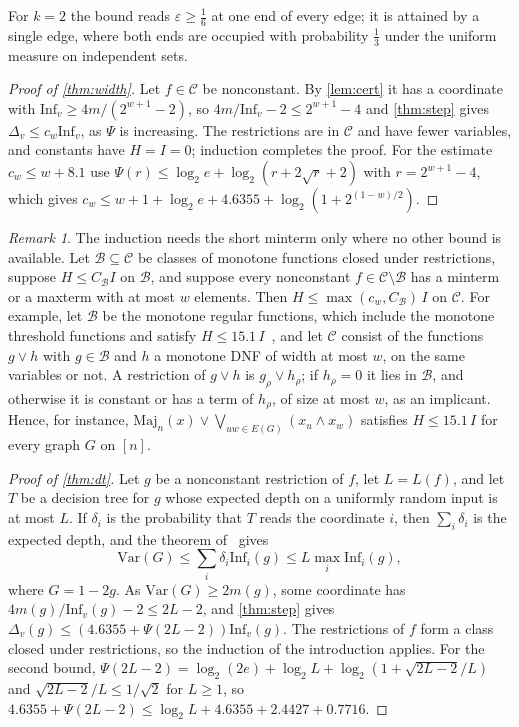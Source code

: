 \documentclass[11pt]{amsart}
\theoremstyle{remark}
\newtheorem{remark}[theorem]{Remark}
\newcommand{\Inf}{\mathrm{Inf}}
\newcommand{\Var}{\mathrm{Var}}
\newcommand{\eps}{\varepsilon}
\begin{document}
For $k=2$ the bound reads $\eps\ge\frac16$ at one end of every edge; it is attained by a single edge, where both ends
are occupied with probability $\frac13$ under the uniform measure on independent sets.

\begin{proof}[Proof of \cref{thm:width}]
Let $f\in\mathcal C$ be nonconstant. By \cref{lem:cert} it has a coordinate with $\Inf_v\ge4m/(2^{w+1}-2)$, so
$4m/\Inf_v-2\le2^{w+1}-4$ and \cref{thm:step} gives $\Delta_v\le c_w\Inf_v$, as $\Psi$ is increasing. The restrictions
are in $\mathcal C$ and have fewer variables, and constants have $H=I=0$; induction completes the proof. For the
estimate $c_w\le w+8.1$ use $\Psi(r)\le\log_2e+\log_2(r+2\sqrt r+2)$ with $r=2^{w+1}-4$, which gives
$c_w\le w+1+\log_2e+4.6355+\log_2(1+2^{(1-w)/2})$.
\end{proof}

\begin{remark}\label{rem:mixed}
The induction needs the short minterm only where no other bound is available. Let $\mathcal B\subseteq\mathcal C$ be
classes of monotone functions closed under restrictions, suppose $H\le C_{\mathcal B}I$ on $\mathcal B$, and suppose
every nonconstant $f\in\mathcal C\setminus\mathcal B$ has a minterm or a maxterm with at most $w$ elements. Then
$H\le\max(c_w,C_{\mathcal B})\,I$ on $\mathcal C$. For example, let $\mathcal B$ be the monotone regular functions,
which include the monotone threshold functions and satisfy $H\le15.1\,I$~\cite{Shm26}, and let $\mathcal C$ consist
of the functions $g\vee h$ with $g\in\mathcal B$ and $h$ a monotone DNF of width at most $w$, on the same variables or
not. A restriction of $g\vee h$ is $g_\rho\vee h_\rho$; if $h_\rho=0$ it lies in $\mathcal B$, and otherwise it is
constant or has a term of $h_\rho$, of size at most $w$, as an implicant. Hence, for instance,
$\mathrm{Maj}_n(x)\vee\bigvee_{uw\in E(G)}(x_u\wedge x_w)$ satisfies $H\le15.1\,I$ for every graph $G$ on $[n]$.
\end{remark}

\begin{proof}[Proof of \cref{thm:dt}]
Let $g$ be a nonconstant restriction of $f$, let $L=L(f)$, and let $T$ be a decision tree for $g$ whose expected
depth on a uniformly random input is at most $L$. If $\delta_i$ is the probability that $T$ reads the coordinate $i$,
then $\sum_i\delta_i$ is the expected depth, and the theorem of~\cite{OSSS05} gives
\[
\Var(G)\le\sum_i\delta_i\Inf_i(g)\le L\max_i\Inf_i(g),
\]
where $G=1-2g$. As $\Var(G)\ge2m(g)$, some coordinate has $4m(g)/\Inf_v(g)-2\le2L-2$, and \cref{thm:step} gives
$\Delta_v(g)\le(4.6355+\Psi(2L-2))\Inf_v(g)$. The restrictions of $f$ form a class closed under restrictions, so the
induction of the introduction applies. For the second bound, $\Psi(2L-2)=\log_2(2e)+\log_2L+\log_2(1+\sqrt{2L-2}/L)$
and $\sqrt{2L-2}/L\le1/\sqrt2$ for $L\ge1$, so $4.6355+\Psi(2L-2)\le\log_2L+4.6355+2.4427+0.7716$.
\end{proof}
\end{document}
